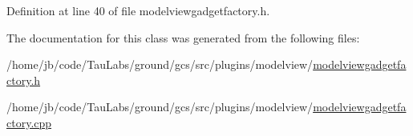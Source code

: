 \-Definition at line 40 of file modelviewgadgetfactory.\-h.



\-The documentation for this class was generated from the following files\-:\begin{DoxyCompactItemize}
\item 
/home/jb/code/\-Tau\-Labs/ground/gcs/src/plugins/modelview/\hyperlink{modelviewgadgetfactory_8h}{modelviewgadgetfactory.\-h}\item 
/home/jb/code/\-Tau\-Labs/ground/gcs/src/plugins/modelview/\hyperlink{modelviewgadgetfactory_8cpp}{modelviewgadgetfactory.\-cpp}\end{DoxyCompactItemize}
